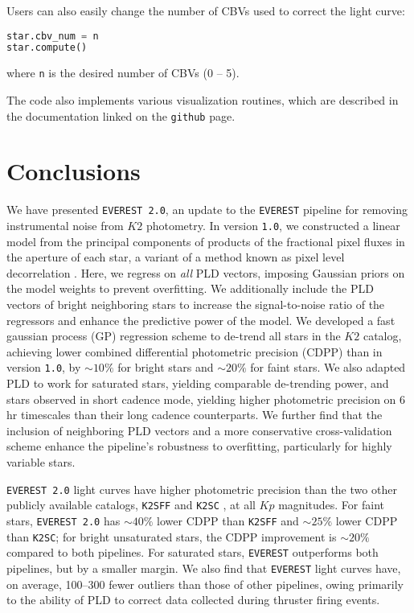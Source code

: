 \documentclass[]{emulateapj}
\newcommand{\Kp}{\ensuremath{Kp}}
\begin{document}
Users can also easily change the number of CBVs used to correct the light curve:
%
\begin{lstlisting}[language=Python]
star.cbv_num = n
star.compute()
\end{lstlisting}
%
where \texttt{n} is the desired number of CBVs (0 -- 5).

The code also implements various visualization routines, which are described in
the documentation linked on the \texttt{github} page.

\section{Conclusions}
\label{sec:conclusions}
We have presented \texttt{EVEREST 2.0}, an update to the \texttt{EVEREST} pipeline
\citep{Luger16} for removing instrumental noise from $K2$ photometry. In version
\texttt{1.0}, we constructed a linear model from the principal components of
products of the fractional pixel fluxes in the aperture of each star, a variant
of a method known as pixel level decorrelation \citep[PLD,][]{Deming15}. Here,
we regress on \emph{all} PLD vectors, imposing Gaussian priors on the model
weights to prevent overfitting. We additionally include the PLD vectors of bright
neighboring stars to increase the signal-to-noise ratio of the regressors and
enhance the predictive power of the model. We developed a fast gaussian process (GP)
regression scheme to de-trend all stars in the $K2$ catalog, achieving lower
combined differential photometric precision (CDPP) than in version \texttt{1.0},
by ${\sim}10\%$ for bright stars and ${\sim}20\%$ for faint stars. We also
adapted PLD to work for saturated stars, yielding comparable de-trending power,
and stars observed in short cadence mode, yielding higher photometric precision
on 6 hr timescales than their long cadence counterparts.
We further find that the inclusion of neighboring PLD vectors and a
more conservative cross-validation scheme enhance the pipeline's robustness
to overfitting, particularly for highly variable stars.

\texttt{EVEREST 2.0} light curves have higher photometric precision than the two
other publicly available catalogs, \texttt{K2SFF} \citep{VanderburgJohnson14}
and \texttt{K2SC} \citep{Aigrain16}, at all $\Kp$ magnitudes. For faint stars,
\texttt{EVEREST 2.0} has ${\sim}40\%$ lower CDPP than \texttt{K2SFF} and
${\sim}25\%$ lower CDPP than \texttt{K2SC}; for bright unsaturated stars, the CDPP
improvement is ${\sim}20\%$ compared to both pipelines. For saturated stars,
\texttt{EVEREST} outperforms both pipelines, but by a smaller margin. We also
find that \texttt{EVEREST} light curves have, on average, 100--300 fewer outliers
than those of other pipelines, owing primarily to the ability of PLD to correct
data collected during thruster firing events.
\end{document}
